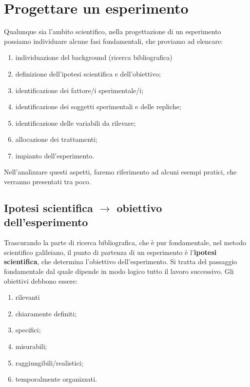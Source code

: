 \documentclass[a4paper,12pt,oneside]{book}
\providecommand{\tightlist}{%
  \setlength{\itemsep}{0pt}\setlength{\parskip}{0pt}}
\begin{document}
\hypertarget{progettare-un-esperimento}{%
\chapter{Progettare un esperimento}\label{progettare-un-esperimento}}

Qualunque sia l'ambito scientifico, nella progettazione di un esperimento possiamo individuare alcune fasi fondamentali, che proviamo ad elencare:

\begin{enumerate}
\def\labelenumi{\arabic{enumi}.}
\tightlist
\item
  individuazione del background (ricerca bibliografica)
\item
  definizione dell'ipotesi scientifica e dell'obiettivo;
\item
  identificazione dei fattore/i sperimentale/i;
\item
  identificazione dei soggetti sperimentali e delle repliche;
\item
  identificazione delle variabili da rilevare;
\item
  allocazione dei trattamenti;
\item
  impianto dell'esperimento.
\end{enumerate}

Nell'analizzare questi aspetti, faremo riferimento ad alcuni esempi pratici, che verranno presentati tra poco.

\hypertarget{ipotesi-scientifica-rightarrow-obiettivo-dellesperimento}{%
\section{\texorpdfstring{Ipotesi scientifica \(\rightarrow\) obiettivo dell'esperimento}{Ipotesi scientifica \textbackslash{}rightarrow obiettivo dell'esperimento}}\label{ipotesi-scientifica-rightarrow-obiettivo-dellesperimento}}

Trascurando la parte di ricerca bibliografica, che è pur fondamentale, nel metodo scientifico galileiano, il punto di partenza di un esperimento è l'\textbf{ipotesi scientifica}, che determina l'obiettivo dell'esperimento. Si tratta del passaggio fondamentale dal quale dipende in modo logico tutto il lavoro successivo. Gli obiettivi debbono essere:

\begin{enumerate}
\def\labelenumi{\arabic{enumi}.}
\tightlist
\item
  rilevanti
\item
  chiaramente definiti;
\item
  specifici;
\item
  misurabili;
\item
  raggiungibili/realistici;
\item
  temporalmente organizzati.
\end{enumerate}
\end{document}
